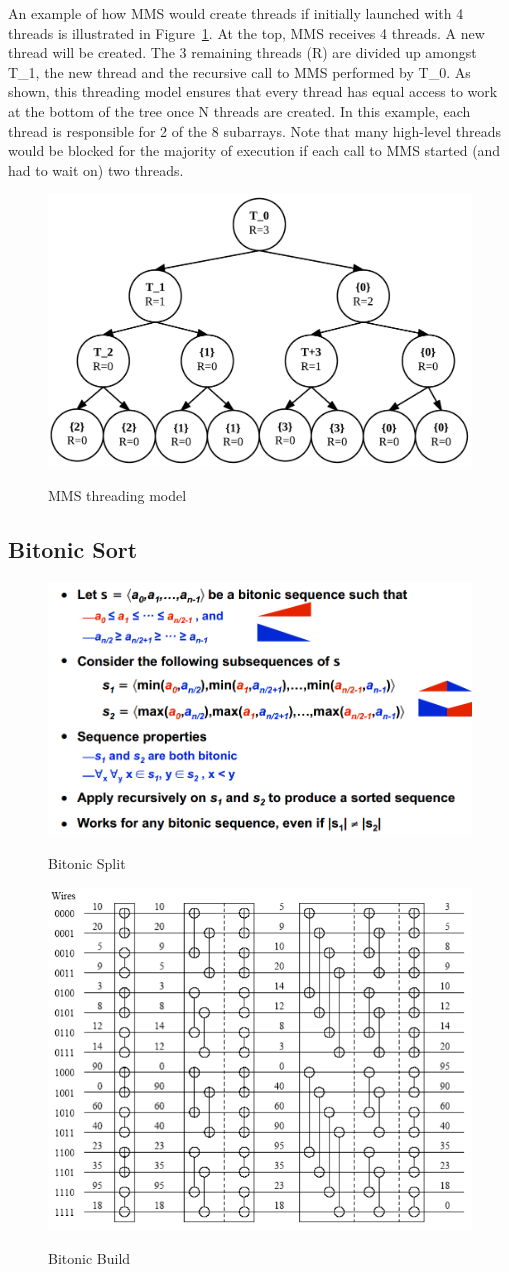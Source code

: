 \documentclass[journal]{IEEEtran}
\begin{document}
An example of how MMS would create threads if initially launched with 4 threads is illustrated in Figure~\ref{mms_thread}.  At the top, MMS receives 4 threads. A new thread will be created.  The 3 remaining threads (R) are divided up amongst T\_1, the new thread and the recursive call to MMS performed by T\_0.  As shown, this threading model ensures that every thread has equal access to work at the bottom of the tree once N threads are created.  In this example, each thread is responsible for 2 of the 8 subarrays.  Note that many high-level threads would be blocked for the majority of execution if each call to MMS started (and had to wait on) two threads.

\begin{figure}[f]
\caption{MMS threading model}
\centering
\includegraphics[width=.5\textwidth]{include/mms.png}
\label{mms_thread}
\end{figure}


\subsection{Bitonic Sort}

	\begin{figure}[t!]
	\caption{Bitonic Split}
  \centering
	\includegraphics[width=.5\textwidth]{bitonic_split.png}
	\label{bitonic_split}
	\end{figure}
	
	\begin{figure}[t!]
	\caption{Bitonic Build}
  \centering
	\includegraphics[width=.5\textwidth]{bitonic_build_2.png}
	\label{bitonic_build}
	\end{figure}
\end{document}
